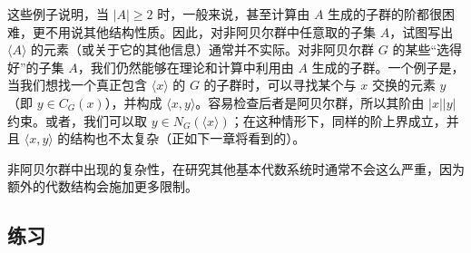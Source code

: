 这些例子说明，当 $|A|\geq2$ 时，一般来说，甚至计算由 $A$ 生成的子群的阶都很困难，更不用说其他结构性质。因此，对非阿贝尔群中任意取的子集 $A$，试图写出 $\langle A\rangle$ 的元素（或关于它的其他信息）通常并不实际。对非阿贝尔群 $G$ 的某些“选得好”的子集 $A$，我们仍然能够在理论和计算中利用由 $A$ 生成的子群。一个例子是，当我们想找一个真正包含 $\langle x\rangle$ 的 $G$ 的子群时，可以寻找某个与 $x$ 交换的元素 $y$（即 $y\in C_G(x)$），并构成 $\langle x,y\rangle$。容易检查后者是阿贝尔群，所以其阶由 $|x||y|$ 约束。或者，我们可以取 $y\in N_G(\langle x\rangle)$；在这种情形下，同样的阶上界成立，并且 $\langle x,y\rangle$ 的结构也不太复杂（正如下一章将看到的）。

非阿贝尔群中出现的复杂性，在研究其他基本代数系统时通常不会这么严重，因为额外的代数结构会施加更多限制。

\subsection*{练习}

